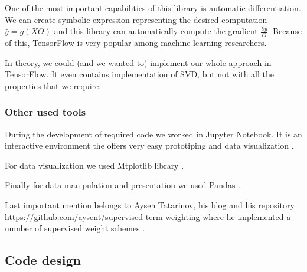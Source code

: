     One of the most important capabilities of this library is automatic differentiation.
    We can create symbolic expression representing the desired computation $\hat{y}=g(X\Theta)$ and this library can automatically compute the gradient $\frac{\partial \hat{y}}{\Theta}$.
    Because of this, TensorFlow is very popular among  machine learning researchers.
    
    In theory, we could (and we wanted to) implement our whole approach in TensorFlow.
    It even contains implementation of SVD, but not with all the properties that we require.
    
    \subsubsection{Other used tools}
    
    During the development of required code we worked in Jupyter Notebook. 
    It is an interactive environment the offers very easy prototiping and
    data visualization \cite{PER-GRA:2007}. %
    
    For data visualization we used Mtplotlib library \cite{hunter2007matplotlib}. %
    
    Finally for data manipulation and presentation we used Pandas \cite{mckinney2010data}. %
    
    Last important mention belongs to Aysen Tatarinov, his blog and his repository \url{https://github.com/aysent/supervised-term-weighting} where he implemented a number of supervised weight schemes \cite{maas2011learning}.
    \* %
    
    \subsection{Code design} 
    
    \* %